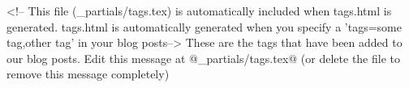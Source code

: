<!-- This file (_partials/tags.tex) is automatically included when tags.html is generated.
	tags.html is automatically generated when you specify a 'tags=some tag,other tag' in your blog posts-->
These are the tags that have been added to our blog posts. Edit this message at @_partials/tags.tex@ (or delete the file to remove this message completely)